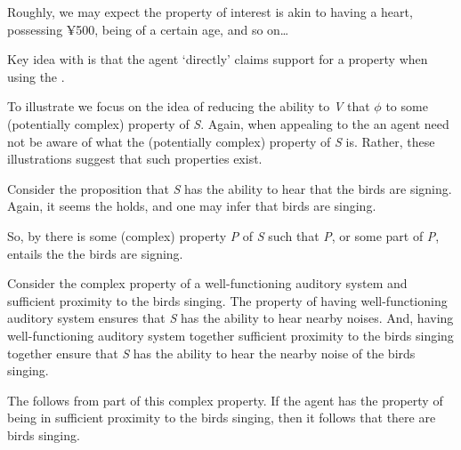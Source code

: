 \begin{note}

  Roughly, we may expect the property of interest is akin to having a heart, possessing ¥500, being of a certain age, and so on\dots

  {
    \color{red}
    Key idea with \AR{} is that the agent `directly' claims support for a property when using the \aben{}.
  }

  To illustrate \AR{} we focus on the idea of reducing the ability to \emph{V} that \(\phi\) to some (potentially complex) property of \emph{S}.
  Again, when appealing to the \aben{} an agent need not be aware of what the (potentially complex) property of \emph{S} is.
  Rather, these illustrations suggest that such properties exist.

  \begin{illustration}
    Consider the proposition that \emph{S} has the ability to hear that the birds are signing.
    Again, it seems the \aben{} holds, and one may infer that birds are singing.

    So, by \AR{} there is some (complex) property \emph{P} of \emph{S} such that \emph{P}, or some part of \emph{P}, entails the the birds are signing.

    Consider the complex property of a well-functioning auditory system and sufficient proximity to the birds singing.
    The property of having well-functioning auditory system ensures that \emph{S} has the ability to hear nearby noises.
    And, having well-functioning auditory system together sufficient proximity to the birds singing together ensure that \emph{S} has the ability to hear the nearby noise of the birds singing.

    The \aben{} follows from part of this complex property.
    If the agent has the property of being in sufficient proximity to the birds singing, then it follows that there are birds singing.
  \end{illustration}


\end{note}
